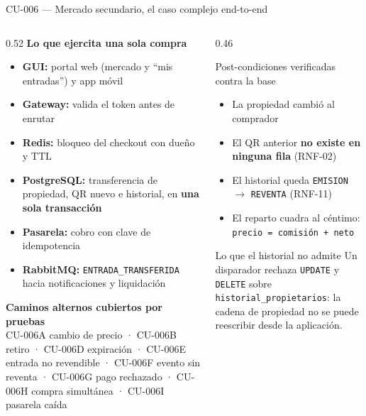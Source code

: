 \documentclass[aspectratio=169,10pt,xcolor={table}]{beamer}
\begin{document}
\begin{frame}{CU-006 --- Mercado secundario, el caso complejo end-to-end}
  \scriptsize
  \begin{columns}[T]
    \begin{column}{0.52\textwidth}
      \textbf{Lo que ejercita una sola compra}
      \begin{itemize}\scriptsize
        \item \textbf{GUI:} portal web (mercado y ``mis entradas'') y app móvil
        \item \textbf{Gateway:} valida el token antes de enrutar
        \item \textbf{Redis:} bloqueo del checkout con dueño y TTL
        \item \textbf{PostgreSQL:} transferencia de propiedad, QR nuevo e historial, en
              \textbf{una sola transacción}
        \item \textbf{Pasarela:} cobro con clave de idempotencia
        \item \textbf{RabbitMQ:} \texttt{ENTRADA\_TRANSFERIDA} hacia notificaciones y liquidación
      \end{itemize}
      \vspace{0.4em}
      \textbf{Caminos alternos cubiertos por pruebas} \\
      CU-006A cambio de precio · CU-006B retiro · CU-006D expiración ·
      CU-006E entrada no revendible · CU-006F evento sin reventa ·
      CU-006G pago rechazado · CU-006H compra simultánea · CU-006I pasarela caída
    \end{column}
    \begin{column}{0.46\textwidth}
      \begin{block}{Post-condiciones verificadas contra la base}
        \scriptsize
        \begin{itemize}
          \item La propiedad cambió al comprador
          \item El QR anterior \textbf{no existe en ninguna fila} (RNF-02)
          \item El historial queda \texttt{EMISION} $\rightarrow$ \texttt{REVENTA} (RNF-11)
          \item El reparto cuadra al céntimo:
                \texttt{precio = comisión + neto}
        \end{itemize}
      \end{block}
      \vspace{0.3em}
      \begin{alertblock}{Lo que el historial no admite}
        \scriptsize Un disparador rechaza \texttt{UPDATE} y \texttt{DELETE} sobre
        \texttt{historial\_propietarios}: la cadena de propiedad no se puede reescribir desde la
        aplicación.
      \end{alertblock}
    \end{column}
  \end{columns}
\end{frame}
\end{document}
